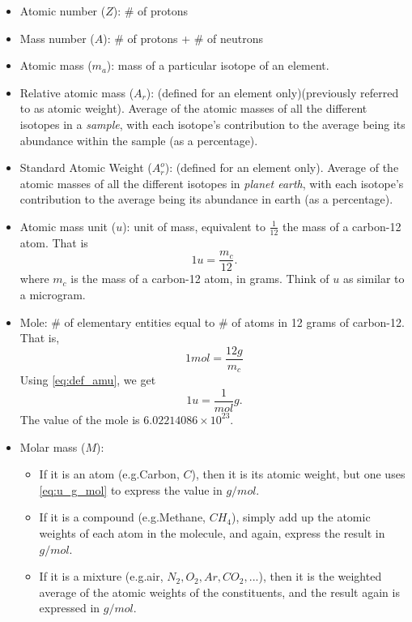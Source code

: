 \documentclass[a4paper,11pt]{report}
\begin{document}
\begin{itemize}

\item Atomic number ($Z$): \# of protons

\item Mass number ($A$): \# of protons + \# of neutrons

\item Atomic mass ($m_a$): mass of a particular isotope of an element.

\item Relative atomic mass ($A_r$): (defined for an element only)(previously referred to as atomic weight). Average of the atomic masses of all the different isotopes in a \textit{sample}, with each isotope's contribution to the average being its abundance within the sample (as a percentage).

\item Standard Atomic Weight ($A_r^o$): (defined for an element only). Average of the atomic masses of all the different isotopes in \textit{planet earth}, with each isotope's contribution to the average being its abundance in earth (as a percentage).

\item Atomic mass unit ($u$): unit of mass, equivalent to $\frac{1}{12}$ the mass of a carbon-12 atom. That is 
\begin{equation}
\label{eq:def_amu}
1u = \frac{m_c}{12}.
\end{equation}
where $m_c$ is the mass of a carbon-12 atom, in grams. Think of $u$ as similar to a microgram.

\item Mole: \# of elementary entities equal to \# of atoms in 12 grams of carbon-12. That is,
\begin{equation}
1 mol = \frac{12g}{m_c}
\end{equation}
Using \cref{eq:def_amu}, we get
\begin{equation}
\label{eq:u_g_mol}
1u = \frac{1}{mol} g.
\end{equation}
The value of the mole is $6.02214086 \times 10^{23}$.

\item Molar mass ($M$): 
\begin{itemize}
    \item If it is an atom (e.g.\@ Carbon, $C$), then it is its atomic weight, but one uses \cref{eq:u_g_mol} to express the value in $g/mol$. 
    \item If it is a compound (e.g.\@ Methane, $CH_4$), simply add up the atomic weights of each atom in the molecule, and again, express the result in $g/mol$.
    \item If it is a mixture (e.g.\@ air, $N_2,O_2,Ar,CO_2,...$), then it is the weighted average of the atomic weights of the constituents, and the result again is expressed in $g/mol$.
\end{itemize}


\end{itemize}
\end{document}

